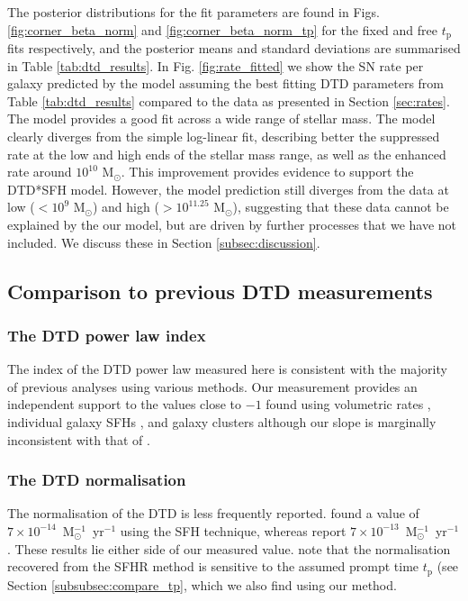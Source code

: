 \documentclass[fleqn,usenatbib]{mnras}
\begin{document}
The posterior distributions for the fit parameters are found in Figs. \ref{fig:corner_beta_norm} and \ref{fig:corner_beta_norm_tp} for the fixed and free $t_{\mathrm{p}}$ fits respectively, and the posterior means and standard deviations are summarised in Table \ref{tab:dtd_results}. In Fig. \ref{fig:rate_fitted} we show the SN rate per galaxy predicted by the model assuming the best fitting DTD parameters from Table \ref{tab:dtd_results} compared to the data as presented in Section \ref{sec:rates}. The model provides a good fit across a wide range of stellar mass. The model clearly diverges from the simple log-linear fit, describing better the suppressed rate at the low and high ends of the stellar mass range, as well as the enhanced rate around $10^{10}$ M$_{\odot}$. This improvement provides evidence to support the DTD*SFH model. However, the model prediction still diverges from the data at low ($<10^9$ M$_{\odot}$) and high ($>10^{11.25}$ M$_{\odot}$), suggesting that these data cannot be explained by the our model, but are driven by further processes that we have not included. We discuss these in Section \ref{subsec:discussion}.

\subsection{Comparison to previous DTD measurements \label{subsec:compare_dtd}}

\subsubsection{The DTD power law index \label{subsubsec:compare_beta}}
The index of the DTD power law measured here is consistent with the majority of previous analyses using various methods. Our measurement provides an independent support to the values close to $-1$ found using volumetric rates \citep[e.g.][]{Graur2018,Frohmaier2019}, individual galaxy SFHs \citep[e.g.][]{Maoz2012,Graur2013}, and galaxy clusters \citep[e.g.][]{Maoz2010} although our slope is marginally inconsistent with that of \citet{Heringer2019}. 

\subsubsection{The DTD normalisation \label{subsubsec:compare_A}}
The normalisation of the DTD is less frequently reported. \citet{Graur2013} found a value of $7 \times 10^{-14}$~M$_{\odot}^{-1}$~yr$^{-1}$ using the SFH technique, whereas \citet{Heringer2019} report $7 \times 10^{-13}$~M$_{\odot}^{-1}$~yr$^{-1}$. These results lie either side of our measured value. \citet{Heringer2019} note that the normalisation recovered from the SFHR method is sensitive to the assumed prompt time $t_{\mathrm{p}}$ (see Section \ref{subsubsec:compare_tp}, which we also find using our method.
\end{document}
